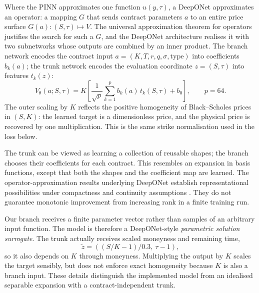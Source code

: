 \documentclass[11pt,a4paper]{article}
\begin{document}
Where the PINN approximates one function $u(y,\tau)$, a DeepONet approximates an operator: a mapping $G$ that sends contract parameters $a$ to an entire price surface $G(a)\colon(S,\tau)\mapsto V$. The universal approximation theorem for operators \cite{chen1995} justifies the search for such a $G$, and the DeepONet architecture \cite{lu2021} realises it with two subnetworks whose outputs are combined by an inner product. The branch network encodes the contract input $a=(K,T,r,q,\sigma,\mathrm{type})$ into coefficients $b_k(a)$; the trunk network encodes the evaluation coordinate $z=(S,\tau)$ into features $t_k(z)$:
\begin{equation}
V_\theta(a;S,\tau)=K\left[\frac{1}{\sqrt p}\sum_{k=1}^{p}b_k(a)\,t_k(S,\tau)+b_0\right],\qquad p=64 .
\label{eq:deeponet}
\end{equation}
The outer scaling by $K$ reflects the positive homogeneity of Black--Scholes prices in $(S,K)$: the learned target is a dimensionless price, and the physical price is recovered by one multiplication. This is the same strike normalisation used in the loss below.

The trunk can be viewed as learning a collection of reusable shapes; the branch chooses their coefficients for each contract. This resembles an expansion in basis functions, except that both the shapes and the coefficient map are learned. The operator-approximation results underlying DeepONet establish representational possibilities under compactness and continuity assumptions \cite{chen1995,lu2021}. They do not guarantee monotonic improvement from increasing rank in a finite training run.

Our branch receives a finite parameter vector rather than samples of an arbitrary input function. The model is therefore a DeepONet-style \emph{parametric solution surrogate}. The trunk actually receives scaled moneyness and remaining time,
\begin{equation}
\widetilde z=\left((S/K-1)/0.3,\ \tau-1\right),
\end{equation}
so it also depends on $K$ through moneyness. Multiplying the output by $K$ scales the target sensibly, but does not enforce exact homogeneity because $K$ is also a branch input. These details distinguish the implemented model from an idealised separable expansion with a contract-independent trunk.
\end{document}
